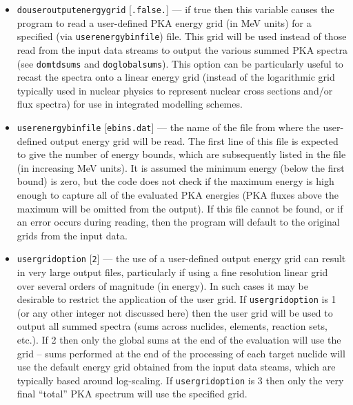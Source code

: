 \documentclass[a4paper]{article}
\begin{document}
\begin{itemize}

\item \texttt{do{\textunderscore}user{\textunderscore}output{\textunderscore}energy{\textunderscore}grid} [\texttt{.false.}] --- if true then this variable causes the program to read a user-defined PKA energy grid (in MeV units) for a specified (via \texttt{user{\textunderscore}energybin{\textunderscore}file}) file. This grid will be used instead of those read from the input data streams to output the various summed PKA spectra (see \texttt{do{\textunderscore}mtd{\textunderscore}sums} and \texttt{do{\textunderscore}global{\textunderscore}sums}). This option can be particularly useful to recast the spectra onto a linear energy grid (instead of the logarithmic grid typically used in nuclear physics to represent nuclear cross sections and/or flux spectra) for use in integrated modelling schemes.

\item \texttt{user{\textunderscore}energybin{\textunderscore}file} [\texttt{ebins.dat}] --- the name of the file from where the user-defined output energy grid will be read. The first line of this file is expected to give the number of energy bounds, which are subsequently listed in the file (in increasing MeV units). It is assumed the minimum energy (below the first bound) is zero, but the code does not check if the maximum energy is high enough to capture all of the evaluated PKA energies (PKA fluxes above the maximum will be omitted from the output). If this file cannot be found, or if an error occurs during reading, then the program will default to the original grids from the input data.

\item \texttt{user{\textunderscore}grid{\textunderscore}option} [\texttt{2}] --- the use of a user-defined output energy grid can result in very large output files, particularly if using a fine resolution linear grid over several orders of magnitude (in energy). In such cases it may be desirable to restrict the application of the user grid. If \texttt{user{\textunderscore}grid{\textunderscore}option} is 1 (or any other integer not discussed here) then the user grid will be used to output all summed spectra (sums across nuclides, elements, reaction sets, etc.). If 2 then only the global sums at the end of the evaluation will use the grid -- sums performed at the end of the processing of each target nuclide will use the default energy grid obtained from the input data steams, which are typically based around log-scaling. If \texttt{user{\textunderscore}grid{\textunderscore}option} is 3 then only the very final ``total'' PKA spectrum will use the specified grid.
\end{itemize}
\end{document}
